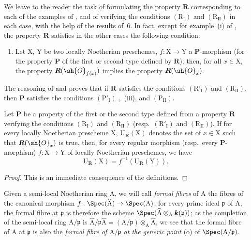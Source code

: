\begin{remark}[7.3.11]
\label{IV.7.3.11}
We leave to the reader the task of formulating the property $\boldsymbol{R}$ corresponding to each of the examples of , and of verifying the conditions $(\mathrm{R_I})$ and $(\mathrm{R_{II}})$ in each case, with the help of the results of \textsection\,6.
In fact, except for example~(i) of , the property $\boldsymbol{R}$ satisfies in the other cases the following condition:
\begin{enumerate}
  \item[$(\mathrm{R}'_\mathrm{I})$] Let $\mathrm{X}$, $\mathrm{Y}$ be two locally Noetherian preschemes, $f:\mathrm{X}\to\mathrm{Y}$ a $\boldsymbol{P}$-morphism (for the property $\boldsymbol{P}$ of the first or second type defined by $\boldsymbol{R}$); then, for all $x\in\mathrm{X}$, the property $\boldsymbol{R}(\sh{O}_{f(x)})$ implies the property $\boldsymbol{R}(\sh{O}_x)$.
\end{enumerate}
The reasoning of  and  proves that if $\boldsymbol{R}$ satisfies the conditions $(\mathrm{R}'_\mathrm{I})$ and $(\mathrm{R_{II}})$, then $\boldsymbol{P}$ satisfies the conditions $(\mathrm{P'_I})$ ,~(iii), and $(\mathrm{P_{II}})$.
\end{remark}

\begin{proposition}[7.3.12]
\label{IV.7.3.12}
Let $\boldsymbol{P}$ be a property of the first or the second type defined from a property $\boldsymbol{R}$ verifying the conditions $(\mathrm{R_I})$ and $(\mathrm{R_{II}})$ (resp.~$(\mathrm{R}'_\mathrm{I})$ and $(\mathrm{R_{II}})$).
If for every locally Noetherian prescheme $\mathrm{X}$, $\mathrm{U}_{\boldsymbol{R}}(\mathrm{X})$ denotes the set of $x\in\mathrm{X}$ such that $\boldsymbol{R}(\sh{O}_x)$ is true, then, for every regular morphism (resp.~every $\boldsymbol{P}$-morphism) $f:\mathrm{X}\to\mathrm{Y}$ of locally Noetherian preschemes, we have
\[
  \mathrm{U}_{\boldsymbol{R}}(\mathrm{X})=f^{-1}(\mathrm{U}_{\boldsymbol{R}}(\mathrm{Y})).
  \tag{7.3.12.1}
\label{IV.7.3.12.1}
\]
\end{proposition}

\begin{proof}
This is an immediate consequence of the definitions.
\end{proof}

\begin{env}[7.3.13]
\label{IV.7.3.13}
Given a semi-local Noetherian ring $\mathrm{A}$, we will call \emph{formal fibres} of $\mathrm{A}$ the fibres of the canonical morphism $f:\Spec(\widehat{\mathrm{A}})\to\Spec(\mathrm{A})$; for every prime ideal $\mathfrak{p}$ of $\mathrm{A}$, the formal fibre at $\mathfrak{p}$ is therefore the scheme $\Spec(\widehat{\mathrm{A}}\otimes_\mathrm{A}\boldsymbol{k}(\mathfrak{p}))$; as the completion of the semi-local ring $\mathrm{A}/\mathfrak{p}$ is $\widehat{\mathrm{A}}/\mathfrak{p}\widehat{\mathrm{A}}=(\mathrm{A}/\mathfrak{p})\otimes_\mathrm{A}\widehat{\mathrm{A}}$, we see that the formal fibre of $\mathrm{A}$ at $\mathfrak{p}$ is also the \emph{formal fibre of $\mathrm{A}/\mathfrak{p}$ at the generic point} (o) of $\Spec(\mathrm{A}/\mathfrak{p})$.
\end{env}


